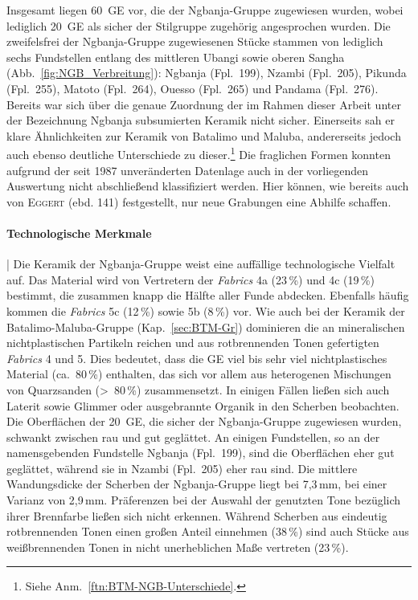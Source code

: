 Insgesamt liegen 60~GE vor, die der \mbox{Ngbanja}-Gruppe zugewiesen wurden, wobei lediglich 20~GE als sicher der Stilgruppe zugehörig angesprochen wurden. Die zweifelsfrei der \mbox{Ngbanja}-Gruppe zugewiesenen Stücke stammen von lediglich sechs Fundstellen entlang des mittleren \mbox{Ubangi} sowie oberen \mbox{Sangha} (Abb.~\ref{fig:NGB_Verbreitung}): \mbox{Ngbanja} (Fpl.~199), Nzambi (Fpl.~205), Pikunda (Fpl.~255), Matoto (Fpl.~264), Ouesso (Fpl.~265) und Pandama (Fpl.~276). Bereits \textcite[140\,f. Fig.~13.4--5]{Eggert.1987c} war sich über die genaue Zuordnung der im Rahmen dieser Arbeit unter der Bezeichnung \mbox{Ngbanja} subsumierten Keramik nicht sicher. Einerseits sah er klare Ähnlichkeiten zur Keramik von Batalimo und Maluba, andererseits jedoch auch ebenso deutliche Unterschiede zu dieser.\footnote{Siehe Anm.~\ref{ftn:BTM-NGB-Unterschiede}.} Die fraglichen Formen konnten aufgrund der seit 1987 unveränderten Datenlage auch in der vorliegenden Auswertung nicht abschließend klassifiziert werden. Hier können, wie bereits auch von \textsc{Eggert} (ebd. 141) festgestellt, nur neue Grabungen eine Abhilfe schaffen.

\paragraph{Technologische Merkmale}\hspace{-.5em}|\hspace{.5em}%
Die Keramik der \mbox{Ngbanja}-Gruppe weist eine auffällige technologische Vielfalt auf. Das Material wird von Vertretern der \textit{Fabrics} 4a (23\,\%) und 4c (19\,\%) bestimmt, die zusammen knapp die Hälfte aller Funde abdecken. Ebenfalls häufig kommen die \textit{Fabrics} 5c (12\,\%) sowie 5b (8\,\%) vor. Wie auch bei der Keramik der Batalimo-Maluba-Gruppe (Kap.~\ref{sec:BTM-Gr}) dominieren die an mineralischen nichtplastischen Partikeln reichen und aus rotbrennenden Tonen gefertigten \textit{Fabrics} 4 und 5. Dies bedeutet, dass die GE viel bis sehr viel nichtplastisches Material (ca.~80\,\%) enthalten, das sich vor allem aus heterogenen Mischungen von Quarzsanden (>~80\,\%) zusammensetzt. In einigen Fällen ließen sich auch Laterit sowie Glimmer oder ausgebrannte Organik in den Scherben beobachten. Die Oberflächen der 20~GE, die sicher der \mbox{Ngbanja}-Gruppe zugewiesen wurden, schwankt zwischen rau und gut geglättet. An einigen Fundstellen, so an der namensgebenden Fundstelle \mbox{Ngbanja} (Fpl.~199), sind die Oberflächen eher gut geglättet, während sie in Nzambi (Fpl.~205) eher rau sind. Die mittlere Wandungsdicke der Scherben der \mbox{Ngbanja}-Gruppe liegt bei 7,3\,mm, bei einer Varianz von 2,9\,mm. Präferenzen bei der Auswahl der genutzten Tone bezüglich ihrer Brennfarbe ließen sich nicht erkennen. Während Scherben aus eindeutig rotbrennenden Tonen einen großen Anteil einnehmen (38\,\%) sind auch Stücke aus weißbrennenden Tonen in nicht unerheblichen Maße vertreten (23\,\%).


